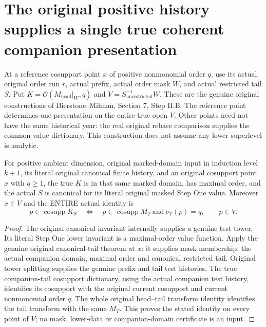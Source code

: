 \section{The original positive history supplies a single true coherent companion presentation}

At a reference cosupport point $x$ of positive nonmonomial order $q$, use
its actual original order run $r$, actual prefix, actual order mask $W$, and
actual restricted tail $S$. Put $K=\mathcal O(M_{\mathrm{head}}|_W,q)$ and
$V=S_{\mathrm{unrestricted}}^{-1}W$. These are the genuine original
constructions of Bierstone--Milman\cite{bierstone-milman08-functoriality},
Section 7, Step II.B. The reference point determines one presentation on the
entire true open $V$. Other points need not have the same historical year:
the real original rebase comparison supplies the common value dictionary.
This construction does not assume any lower superlevel is analytic.

\begin{lemma}
\label{hir:original-frozen-companion-domain-whole-cosupport}
\leanok
{}
For positive ambient dimension, original marked-domain input in induction
level $k+1$, its literal original canonical finite history, and an original
cosupport point $x$ with $q\ge1$, the true $K$ is in that same marked domain,
has maximal order, and the actual $S$ is canonical for its literal original
masked Step One value. Moreover $x\in V$ and the ENTIRE actual identity is
\[
 p\in\operatorname{cosupp}K_S
 \quad\Longleftrightarrow\quad
 p\in\operatorname{cosupp}M_T\ \text{and}\ \nu_T(p)=q,
 \qquad p\in V.
\]
\end{lemma}
\begin{proof}
The original canonical invariant internally supplies a genuine test tower.
Its literal Step One lower invariant is a maximal-order value function.
Apply the genuine original canonical-tail theorem at $x$: it supplies
mask membership, the actual companion domain, maximal order and canonical
restricted tail. Original tower splitting supplies the genuine prefix and
tail test histories. The true companion-tail cosupport dictionary, using
the actual companion test history, identifies its cosupport with the
original current cosupport and current nonmonomial order $q$. The whole
original head--tail transform identity identifies the tail transform with
the same $M_T$. This proves the stated identity on every point of $V$;
no mask, lower-data or companion-domain certificate is an input.
\end{proof}

